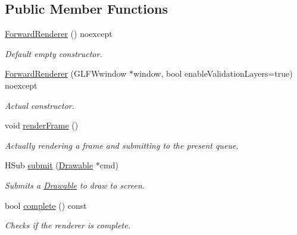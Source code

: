 \subsection*{Public Member Functions}
\begin{DoxyCompactItemize}
\item 
\mbox{\label{classblaze_1_1ForwardRenderer_afdb79d0a5f62e871d166f0e621520a5d}} 
\hyperlink{classblaze_1_1ForwardRenderer_afdb79d0a5f62e871d166f0e621520a5d}{Forward\+Renderer} () noexcept
\begin{DoxyCompactList}\small\item\em Default empty constructor. \end{DoxyCompactList}\item 
\hyperlink{classblaze_1_1ForwardRenderer_abf0b80128aa61686461b3069004b65a9}{Forward\+Renderer} (G\+L\+F\+Wwindow $\ast$window, bool enable\+Validation\+Layers=true) noexcept
\begin{DoxyCompactList}\small\item\em Actual constructor. \end{DoxyCompactList}\item 
\mbox{\label{classblaze_1_1ForwardRenderer_ae547518efb38283e0111899bccabbe9f}} 
void \hyperlink{classblaze_1_1ForwardRenderer_ae547518efb38283e0111899bccabbe9f}{render\+Frame} ()
\begin{DoxyCompactList}\small\item\em Actually rendering a frame and submitting to the present queue. \end{DoxyCompactList}\item 
\mbox{\label{classblaze_1_1ForwardRenderer_acfacb0d44b7f1f1f90bbdbeb762c0ac0}} 
H\+Sub \hyperlink{classblaze_1_1ForwardRenderer_acfacb0d44b7f1f1f90bbdbeb762c0ac0}{submit} (\hyperlink{classblaze_1_1Drawable}{Drawable} $\ast$cmd)
\begin{DoxyCompactList}\small\item\em Submits a \hyperlink{classblaze_1_1Drawable}{Drawable} to draw to screen. \end{DoxyCompactList}\item 
bool \hyperlink{classblaze_1_1ForwardRenderer_a78175e4b430f0046db968f8476ec121c}{complete} () const
\begin{DoxyCompactList}\small\item\em Checks if the renderer is complete. \end{DoxyCompactList}\end{DoxyCompactItemize}
